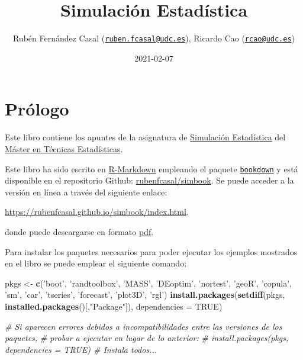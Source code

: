 \documentclass[
]{book}
\title{Simulación Estadística}
\author{Rubén Fernández Casal (\href{mailto:ruben.fcasal@udc.es}{\nolinkurl{ruben.fcasal@udc.es}}), Ricardo Cao (\href{mailto:rcao@udc.es}{\nolinkurl{rcao@udc.es}})}
\date{2021-02-07}
\newenvironment{Shaded}{\begin{snugshade}}{\end{snugshade}}
\newcommand{\CommentTok}[1]{\textcolor[rgb]{0.56,0.35,0.01}{\textit{#1}}}
\newcommand{\DataTypeTok}[1]{\textcolor[rgb]{0.13,0.29,0.53}{#1}}
\newcommand{\KeywordTok}[1]{\textcolor[rgb]{0.13,0.29,0.53}{\textbf{#1}}}
\newcommand{\NormalTok}[1]{#1}
\newcommand{\OtherTok}[1]{\textcolor[rgb]{0.56,0.35,0.01}{#1}}
\newcommand{\StringTok}[1]{\textcolor[rgb]{0.31,0.60,0.02}{#1}}
\theoremstyle{break}
\theoremstyle{definition}
\theoremstyle{definition}
\theoremstyle{definition}
\theoremstyle{remark}
\begin{document}
\maketitle

{
\setcounter{tocdepth}{1}
\tableofcontents
}
\hypertarget{pruxf3logo}{%
\chapter*{Prólogo}\label{pruxf3logo}}

Este libro contiene los apuntes de la asignatura de \href{http://eamo.usc.es/pub/mte/index.php/es/?option=com_content\&view=article\&id=2201\&idm=13\&a\%C3\%B1o=2019}{Simulación Estadística} del \href{http://eio.usc.es/pub/mte}{Máster en Técnicas Estadísticas}.

Este libro ha sido escrito en \href{http://rmarkdown.rstudio.com}{R-Markdown} empleando el paquete \href{https://bookdown.org/yihui/bookdown/}{\texttt{bookdown}} y está disponible en el repositorio Github: \href{https://github.com/rubenfcasal/simbook}{rubenfcasal/simbook}.
Se puede acceder a la versión en línea a través del siguiente enlace:

\url{https://rubenfcasal.github.io/simbook/index.html}.

donde puede descargarse en formato \href{https://rubenfcasal.github.io/simbook/Simulacion.pdf}{pdf}.

Para instalar los paquetes necesarios para poder ejecutar los ejemplos mostrados en el libro se puede emplear el siguiente comando:

\begin{Shaded}
\begin{Highlighting}[]
\NormalTok{pkgs <-}\StringTok{ }\KeywordTok{c}\NormalTok{(}\StringTok{'boot'}\NormalTok{, }\StringTok{'randtoolbox'}\NormalTok{, }\StringTok{'MASS'}\NormalTok{, }\StringTok{'DEoptim'}\NormalTok{, }\StringTok{'nortest'}\NormalTok{, }\StringTok{'geoR'}\NormalTok{, }\StringTok{'copula'}\NormalTok{, }\StringTok{'sm'}\NormalTok{,}
          \StringTok{'car'}\NormalTok{, }\StringTok{'tseries'}\NormalTok{, }\StringTok{'forecast'}\NormalTok{, }\StringTok{'plot3D'}\NormalTok{, }\StringTok{'rgl'}\NormalTok{)}
\KeywordTok{install.packages}\NormalTok{(}\KeywordTok{setdiff}\NormalTok{(pkgs, }\KeywordTok{installed.packages}\NormalTok{()[,}\StringTok{"Package"}\NormalTok{]), }
                 \DataTypeTok{dependencies =} \OtherTok{TRUE}\NormalTok{)}

\CommentTok{# Si aparecen errores debidos a incompatibilidades entre las versiones de los paquetes, }
\CommentTok{# probar a ejecutar en lugar de lo anterior:}
\CommentTok{# install.packages(pkgs, dependencies = TRUE) # Instala todos...}
\end{Highlighting}
\end{Shaded}
\end{document}
